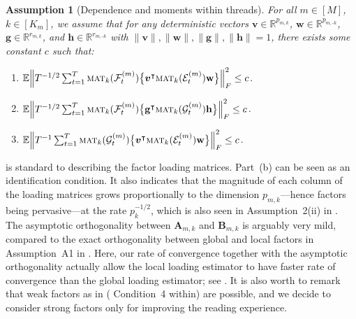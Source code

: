 \documentclass[aos]{imsart}
\theoremstyle{plain}
\newtheorem{assumption}{Assumption}
\theoremstyle{definition}
\def\mat{\textnormal{\textsc{mat}}}
\def\E{\mathbb{E}}
\def\R{\mathbb{R}}
\def\cE{\mathcal{E}}
\def\cF{\mathcal{F}}
\def\cG{\mathcal{G}} \def\cH{\boldsymbol{\mathcal{H}}} \def\cI{\mathcal{I}}
\def\bw{\mathbf{w}}
\def\bh{\mathbf{h}}
\def\bA{\mathbf{A}}
\def\bB{\mathbf{B}}
\def\bv{\boldsymbol{v}}
\def\bg{\mathbf{g}}
\def\trans{\intercal}
\begin{document}
\begin{assumption}[Dependence and moments within threads]\label{ass: dependence_thread}
For all $m\in[M]$, $k\in[K_m]$, we assume that for any deterministic vectors $\bv\in\R^{p_{m,k}}$, $\bw\in\R^{p_{m,\text{-}k}}$, $\bg\in\R^{r_{m,k}}$, and $\bh\in\R^{r_{m,\text{-}k}}$ with $\|\bv\|, \|\bw\|, \|\bg\|, \|\bh\| =1$, there exists some constant $c$ such that: 
\begin{enumerate}[itemsep=0pt, label = (\alph*), left = 0pt]
    \item $\E\Big\| T^{-1/2} \sum_{t=1}^T \mat_k(\cF_t^{(m)}) \big\{ \bv^\trans \mat_k(\cE_t^{(m)}) \bw \big\} \Big\|_F^2 \leq c$.
    \item $\E\Big\| T^{-1/2} \sum_{t=1}^T \mat_k(\cF_t^{(m)}) \big\{ \bg^\trans \mat_k(\cG_t^{(m)}) \bh \big\} \Big\|_F^2 \leq c$.
    \item $\E\Big\| T^{-1} \sum_{t=1}^T \mat_k(\cG_t^{(m)}) \big\{ \bv^\trans \mat_k(\cE_t^{(m)}) \bw \big\} \Big\|_F^2 \leq c$.
\end{enumerate}

\end{assumption}




 is standard to describing the factor loading matrices. Part~(b) can be seen as an identification condition. It also indicates that the magnitude of each column of the loading matrices grows proportionally to the dimension $p_{m,k}$---hence factors being pervasive---at the rate $p_k^{-1/2}$, which is also seen in Assumption~2(ii) in \cite{barigozzi2024moving}. The asymptotic orthogonality between $\bA_{m,k}$ and $\bB_{m,k}$ is arguably very mild, compared to the exact orthogonality between global and local factors in Assumption~A1 in \cite{Huetal2025}. Here, our rate of convergence together with the asymptotic orthogonality actually allow the local loading estimator to have faster rate of convergence than the global loading estimator; see . It is also worth to remark that weak factors as in \cite{Wangetal2019} ( Condition~4 within) are possible, and we decide to consider strong factors only for improving the reading experience.
\end{document}

